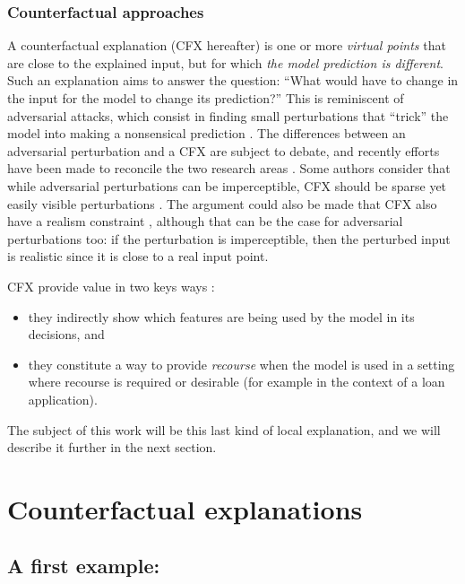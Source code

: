 \documentclass[../main.tex]{subfiles}
\begin{document}
\subsubsection{Counterfactual approaches}\label{par:cfx}

A counterfactual explanation (CFX hereafter) is one or more \emph{virtual points} that are close to the explained input, but for which \emph{the model prediction is different}.
Such an explanation aims to answer the question: ``What would have to change in the input for the model to change its prediction?''
This is reminiscent of adversarial attacks, which consist in finding small perturbations that ``trick'' the model into making a nonsensical prediction \cite{szegedyIntriguing2014,moosavi-dezfooliUniversal2017}.
The differences between an adversarial perturbation and a CFX are subject to debate, and recently efforts have been made to reconcile the two research areas \cite{freieslebenIntriguing2022}.
Some authors consider that while adversarial perturbations can be imperceptible, CFX should be sparse yet easily visible perturbations \cite{laugelLocal2020}.
The argument could also be made that CFX also have a realism constraint \cite{vermaCounterfactual2020}, although that can be the case for adversarial perturbations too: if the perturbation is imperceptible, then the perturbed input is realistic since it is close to a real input point.

CFX provide value in two keys ways \cite{samekExplainable2019}:
\begin{itemize}
    \item they indirectly show which features are being used by the model in its decisions, and
    \item they constitute a way to provide \emph{recourse} when the model is used in a setting where recourse is required or desirable (for example in the context of a loan application).
\end{itemize}

The subject of this work will be this last kind of local explanation, and we will describe it further in the next section.

\section{Counterfactual explanations}

\subsection{A first example: \citeauthor{wachterCounterfactual2017}}
\label{intro/wachter}
\end{document}
